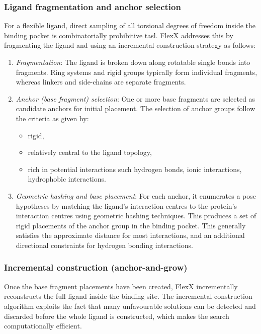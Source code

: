 \documentclass[12pt, a4paper]{article}
\begin{document}
\subsubsection{Ligand fragmentation and anchor selection}
For a flexible ligand, direct sampling of all torsional degrees of freedom inside the binding pocket is combinatorially prohibitive tasl. FlexX addresses this by fragmenting the ligand and using an incremental construction strategy\cite{CH7_rarey1996} as follows:

\begin{enumerate}

  \item \textit{Fragmentation}: The ligand is broken down along rotatable single bonds into fragments. Ring systems and rigid groups typically form individual fragments, whereas linkers and side-chains are separate fragments.

  \item \textit{Anchor (base fragment) selection}: One or more base fragments are selected as candidate anchors for initial placement. The selection of anchor groups follow the criteria as given by:
        \begin{itemize}
          \item rigid,
          \item relatively central to the ligand topology,
          \item rich in potential interactions such hydrogen bonds, ionic interactions, hydrophobic interactions.
        \end{itemize}

  \item \textit{Geometric hashing and base placement}: For each anchor, it enumerates a pose hypotheses by matching the ligand's interaction centres to the protein's interaction centres using geometric hashing techniques.\cite{CH7_rarey1996} This produces a set of rigid placements of the anchor group in the binding pocket. This generally satisfies the approximate distance for most interactions, and an additional directional constraints for hydrogen bonding interactions.
\end{enumerate}

\subsubsection{Incremental construction (anchor-and-grow)}
Once the base fragment placements have been created, FlexX incrementally reconstructs the full ligand inside the binding site. The incremental construction algorithm exploits the fact that many unfavourable solutions can be detected and discarded before the whole ligand is constructed, which makes the search computationally efficient.
\end{document}
